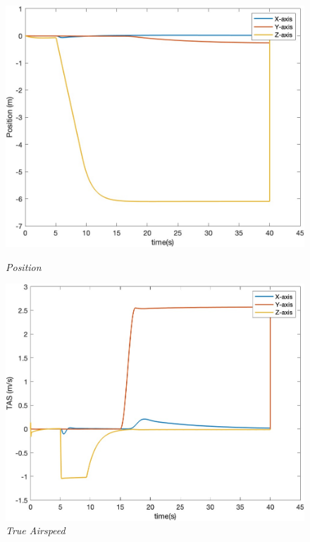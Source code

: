 \begin{figure}[htbp]
  \centering
  \begin{minipage}[b]{0.45\textwidth}
    \centering
    \includegraphics[width=\textwidth]{Images/Gust/VTOL step/1 position_3.jpg}
    \caption*{\textit{Position}}
  \end{minipage}
  \hfil
  \begin{minipage}[b]{0.45\textwidth}
    \centering
    \includegraphics[width=\textwidth]{Images/Gust/VTOL step/2 airspeed_3.jpg}
    \caption*{\textit{True Airspeed}}
  \end{minipage}
  \begin{minipage}[b]{0.45\textwidth}

\end{minipage}
\end{figure}

